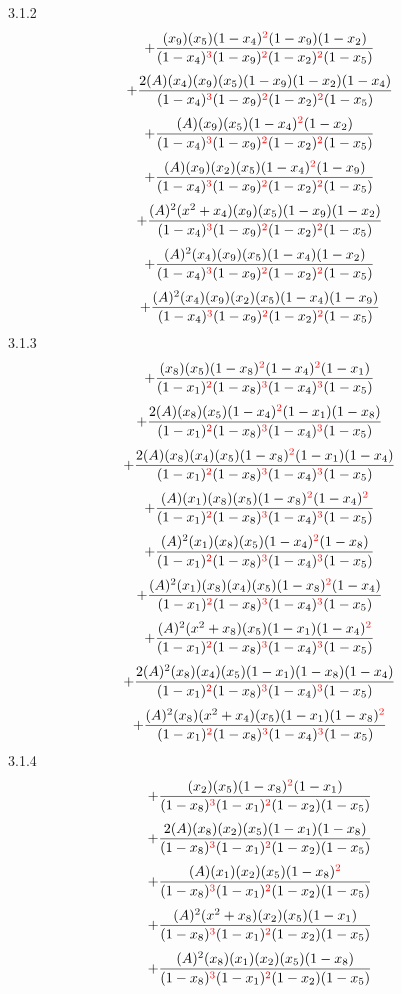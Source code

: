 \documentclass{article}
\begin{document}
3.1.2
\[+\frac{(x_9)(x_5)(1-x_4)^{\textcolor{red}{2}}(1-x_9)(1-x_2)}{(1-x_4)^{\textcolor{red}{3}}(1-x_9)^{\textcolor{red}{2}}(1-x_2)^{\textcolor{red}{2}}(1-x_5)}\]\[+\frac{2(A)(x_4)(x_9)(x_5)(1-x_9)(1-x_2)(1-x_4)}{(1-x_4)^{\textcolor{red}{3}}(1-x_9)^{\textcolor{red}{2}}(1-x_2)^{\textcolor{red}{2}}(1-x_5)}\]\[+\frac{(A)(x_9)(x_5)(1-x_4)^{\textcolor{red}{2}}(1-x_2)}{(1-x_4)^{\textcolor{red}{3}}(1-x_9)^{\textcolor{red}{2}}(1-x_2)^{\textcolor{red}{2}}(1-x_5)}\]\[+\frac{(A)(x_9)(x_2)(x_5)(1-x_4)^{\textcolor{red}{2}}(1-x_9)}{(1-x_4)^{\textcolor{red}{3}}(1-x_9)^{\textcolor{red}{2}}(1-x_2)^{\textcolor{red}{2}}(1-x_5)}\]\[+\frac{(A)^{2}(x^{2}+x_4)(x_9)(x_5)(1-x_9)(1-x_2)}{(1-x_4)^{\textcolor{red}{3}}(1-x_9)^{\textcolor{red}{2}}(1-x_2)^{\textcolor{red}{2}}(1-x_5)}\]\[+\frac{(A)^{2}(x_4)(x_9)(x_5)(1-x_4)(1-x_2)}{(1-x_4)^{\textcolor{red}{3}}(1-x_9)^{\textcolor{red}{2}}(1-x_2)^{\textcolor{red}{2}}(1-x_5)}\]\[+\frac{(A)^{2}(x_4)(x_9)(x_2)(x_5)(1-x_4)(1-x_9)}{(1-x_4)^{\textcolor{red}{3}}(1-x_9)^{\textcolor{red}{2}}(1-x_2)^{\textcolor{red}{2}}(1-x_5)}\]
3.1.3
\[+\frac{(x_8)(x_5)(1-x_8)^{\textcolor{red}{2}}(1-x_4)^{\textcolor{red}{2}}(1-x_1)}{(1-x_1)^{\textcolor{red}{2}}(1-x_8)^{\textcolor{red}{3}}(1-x_4)^{\textcolor{red}{3}}(1-x_5)}\]\[+\frac{2(A)(x_8)(x_5)(1-x_4)^{\textcolor{red}{2}}(1-x_1)(1-x_8)}{(1-x_1)^{\textcolor{red}{2}}(1-x_8)^{\textcolor{red}{3}}(1-x_4)^{\textcolor{red}{3}}(1-x_5)}\]\[+\frac{2(A)(x_8)(x_4)(x_5)(1-x_8)^{\textcolor{red}{2}}(1-x_1)(1-x_4)}{(1-x_1)^{\textcolor{red}{2}}(1-x_8)^{\textcolor{red}{3}}(1-x_4)^{\textcolor{red}{3}}(1-x_5)}\]\[+\frac{(A)(x_1)(x_8)(x_5)(1-x_8)^{\textcolor{red}{2}}(1-x_4)^{\textcolor{red}{2}}}{(1-x_1)^{\textcolor{red}{2}}(1-x_8)^{\textcolor{red}{3}}(1-x_4)^{\textcolor{red}{3}}(1-x_5)}\]\[+\frac{(A)^{2}(x_1)(x_8)(x_5)(1-x_4)^{\textcolor{red}{2}}(1-x_8)}{(1-x_1)^{\textcolor{red}{2}}(1-x_8)^{\textcolor{red}{3}}(1-x_4)^{\textcolor{red}{3}}(1-x_5)}\]\[+\frac{(A)^{2}(x_1)(x_8)(x_4)(x_5)(1-x_8)^{\textcolor{red}{2}}(1-x_4)}{(1-x_1)^{\textcolor{red}{2}}(1-x_8)^{\textcolor{red}{3}}(1-x_4)^{\textcolor{red}{3}}(1-x_5)}\]\[+\frac{(A)^{2}(x^{2}+x_8)(x_5)(1-x_1)(1-x_4)^{\textcolor{red}{2}}}{(1-x_1)^{\textcolor{red}{2}}(1-x_8)^{\textcolor{red}{3}}(1-x_4)^{\textcolor{red}{3}}(1-x_5)}\]\[+\frac{2(A)^{2}(x_8)(x_4)(x_5)(1-x_1)(1-x_8)(1-x_4)}{(1-x_1)^{\textcolor{red}{2}}(1-x_8)^{\textcolor{red}{3}}(1-x_4)^{\textcolor{red}{3}}(1-x_5)}\]\[+\frac{(A)^{2}(x_8)(x^{2}+x_4)(x_5)(1-x_1)(1-x_8)^{\textcolor{red}{2}}}{(1-x_1)^{\textcolor{red}{2}}(1-x_8)^{\textcolor{red}{3}}(1-x_4)^{\textcolor{red}{3}}(1-x_5)}\]
3.1.4
\[+\frac{(x_2)(x_5)(1-x_8)^{\textcolor{red}{2}}(1-x_1)}{(1-x_8)^{\textcolor{red}{3}}(1-x_1)^{\textcolor{red}{2}}(1-x_2)(1-x_5)}\]\[+\frac{2(A)(x_8)(x_2)(x_5)(1-x_1)(1-x_8)}{(1-x_8)^{\textcolor{red}{3}}(1-x_1)^{\textcolor{red}{2}}(1-x_2)(1-x_5)}\]\[+\frac{(A)(x_1)(x_2)(x_5)(1-x_8)^{\textcolor{red}{2}}}{(1-x_8)^{\textcolor{red}{3}}(1-x_1)^{\textcolor{red}{2}}(1-x_2)(1-x_5)}\]\[+\frac{(A)^{2}(x^{2}+x_8)(x_2)(x_5)(1-x_1)}{(1-x_8)^{\textcolor{red}{3}}(1-x_1)^{\textcolor{red}{2}}(1-x_2)(1-x_5)}\]\[+\frac{(A)^{2}(x_8)(x_1)(x_2)(x_5)(1-x_8)}{(1-x_8)^{\textcolor{red}{3}}(1-x_1)^{\textcolor{red}{2}}(1-x_2)(1-x_5)}\]
\end{document}
